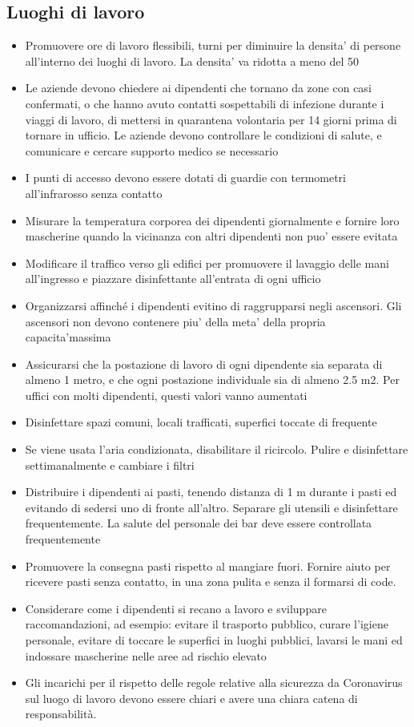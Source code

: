 \documentclass[onecolumn,journal]{IEEEtran}
\begin{document}
\begin{multicols}{2}
\section*{Luoghi di lavoro}
\begin{itemize}
\item Promuovere ore di lavoro flessibili, turni per diminuire la densita’ di persone all’interno dei luoghi di lavoro. La densita’ va ridotta a meno del 50%
\item Le aziende devono chiedere ai dipendenti che tornano da zone con casi confermati, o che hanno avuto contatti sospettabili di infezione durante i viaggi di lavoro, di mettersi in quarantena volontaria per 14 giorni prima di tornare in ufficio. Le aziende devono controllare le condizioni di salute, e comunicare e cercare supporto medico se necessario
\item I punti di accesso devono essere dotati di guardie con termometri all’infrarosso senza contatto
\item Misurare la temperatura corporea dei dipendenti giornalmente e fornire loro mascherine quando la vicinanza con altri dipendenti non puo’ essere evitata
\item Modificare il traffico verso gli edifici per promuovere il lavaggio delle mani all’ingresso e piazzare disinfettante all’entrata di ogni ufficio
\item Organizzarsi affinché i dipendenti evitino di raggrupparsi negli ascensori. Gli ascensori non devono contenere piu’ della meta’ della propria capacita’massima
\item Assicurarsi che la postazione di lavoro di ogni dipendente sia separata di almeno 1 metro, e che ogni postazione individuale sia di almeno 2.5 m2. Per uffici con molti dipendenti, questi valori vanno aumentati
\item Disinfettare spazi comuni, locali trafficati, superfici toccate di frequente
\item Se viene usata l’aria condizionata, disabilitare il ricircolo. Pulire e disinfettare settimanalmente e cambiare i filtri
\item Distribuire i dipendenti ai pasti, tenendo distanza di 1 m durante i pasti ed evitando di sedersi uno di fronte all’altro. Separare gli utensili e disinfettare frequentemente. La salute del personale dei bar deve essere controllata frequentemente
\item Promuovere la consegna pasti rispetto al mangiare fuori. Fornire aiuto per ricevere pasti senza contatto, in una zona pulita e senza il formarsi di code.
\item Considerare come i dipendenti si recano a lavoro e sviluppare raccomandazioni, ad esempio: evitare il trasporto pubblico, curare l’igiene personale, evitare di toccare le superfici in luoghi pubblici, lavarsi le mani ed indossare mascherine nelle aree ad rischio elevato
\item Gli incarichi per il rispetto delle regole relative alla sicurezza da Coronavirus sul luogo di lavoro devono essere chiari e avere una chiara catena di responsabilità.
\end{itemize}
%

\end{multicols}
\end{document}
